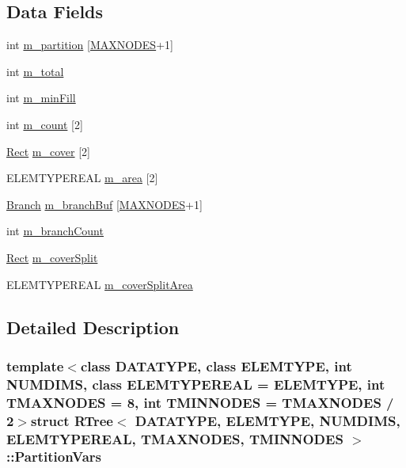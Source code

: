 \subsection*{Data Fields}
\begin{DoxyCompactItemize}
\item 
int \hyperlink{structRTree_1_1PartitionVars_a15b570f93f49884ccd637731d033da51}{m\-\_\-partition} \mbox{[}\hyperlink{classRTree_afaccb2e611f17ff46b623771ad7043d7ac05afe446df73fa67991e5199453a37f}{M\-A\-X\-N\-O\-D\-E\-S}+1\mbox{]}
\item 
int \hyperlink{structRTree_1_1PartitionVars_a145b95cd4210c8e2dbb2015d379906e4}{m\-\_\-total}
\item 
int \hyperlink{structRTree_1_1PartitionVars_a150d1fb0e446df4172c68eafbd0fc00d}{m\-\_\-min\-Fill}
\item 
int \hyperlink{structRTree_1_1PartitionVars_acbf70d46606cebe104471635d1c06c56}{m\-\_\-count} \mbox{[}2\mbox{]}
\item 
\hyperlink{structRTree_1_1Rect}{Rect} \hyperlink{structRTree_1_1PartitionVars_ab59894eefb7f3f6cc7254bbc90cd2570}{m\-\_\-cover} \mbox{[}2\mbox{]}
\item 
E\-L\-E\-M\-T\-Y\-P\-E\-R\-E\-A\-L \hyperlink{structRTree_1_1PartitionVars_aadf67cd0f0c071993f47b77b1e7a3b78}{m\-\_\-area} \mbox{[}2\mbox{]}
\item 
\hyperlink{structRTree_1_1Branch}{Branch} \hyperlink{structRTree_1_1PartitionVars_a73b5e398b4073ff923afaa765367958b}{m\-\_\-branch\-Buf} \mbox{[}\hyperlink{classRTree_afaccb2e611f17ff46b623771ad7043d7ac05afe446df73fa67991e5199453a37f}{M\-A\-X\-N\-O\-D\-E\-S}+1\mbox{]}
\item 
int \hyperlink{structRTree_1_1PartitionVars_abaaed8bac2d71bc6debadc5136078a0b}{m\-\_\-branch\-Count}
\item 
\hyperlink{structRTree_1_1Rect}{Rect} \hyperlink{structRTree_1_1PartitionVars_a61d9eaaae4128365146d923123f4b8d1}{m\-\_\-cover\-Split}
\item 
E\-L\-E\-M\-T\-Y\-P\-E\-R\-E\-A\-L \hyperlink{structRTree_1_1PartitionVars_ada65c4c4ae559f43f3b632bda1b7b7f2}{m\-\_\-cover\-Split\-Area}
\end{DoxyCompactItemize}


\subsection{Detailed Description}
\subsubsection*{template$<$class D\-A\-T\-A\-T\-Y\-P\-E, class E\-L\-E\-M\-T\-Y\-P\-E, int N\-U\-M\-D\-I\-M\-S, class E\-L\-E\-M\-T\-Y\-P\-E\-R\-E\-A\-L = E\-L\-E\-M\-T\-Y\-P\-E, int T\-M\-A\-X\-N\-O\-D\-E\-S = 8, int T\-M\-I\-N\-N\-O\-D\-E\-S = T\-M\-A\-X\-N\-O\-D\-E\-S / 2$>$struct R\-Tree$<$ D\-A\-T\-A\-T\-Y\-P\-E, E\-L\-E\-M\-T\-Y\-P\-E, N\-U\-M\-D\-I\-M\-S, E\-L\-E\-M\-T\-Y\-P\-E\-R\-E\-A\-L, T\-M\-A\-X\-N\-O\-D\-E\-S, T\-M\-I\-N\-N\-O\-D\-E\-S $>$\-::\-Partition\-Vars}

